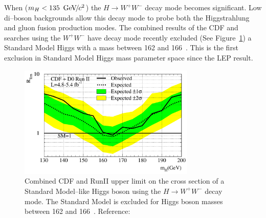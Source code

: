When \mbox{($m_H < 135~{\,\text{Ge\hspace{-.08em}V\hspace{-0.16em}/\hspace{-0.08em}}c^\text{2}}$)} the $H\to W^{+} W^{-}$ decay mode becomes
significant.  Low di--boson backgrounds allow this decay mode to probe both the
Higgstrahlung and gluon fusion production modes. The combined results of the CDF
and \DZERO searches using the $W^+W^-$ have decay mode recently excluded (See
Figure~\ref{fig:TevatronHighMassHiggsLimit}) a Standard Model Higgs with a mass
between 162 and 166~\GeVcc.  This is the first exclusion in Standard Model Higgs
mass parameter space since the LEP result.
\begin{figure}
  \centering
  \includegraphics[width=0.75\textwidth]{theory_chapter/figures/tevwwlimits.pdf}
  \caption[Tevatron high mass Standard Model Higgs limit plot]{Combined CDF and
  \DZERO RunII upper limit on the cross section of a Standard Model--like Higgs
  boson using the $H \to W^+W^-$ decay mode.  The Standard Model is excluded for
  Higgs boson masses between 162 and 166~\GeVcc. Reference:~\cite{PDG}}
  \label{fig:TevatronHighMassHiggsLimit}
\end{figure}

